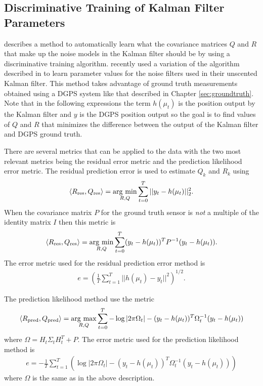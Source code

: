 \subsection{Discriminative Training of Kalman Filter Parameters}
\label{sec:kftrainingparams}
\cite{Abbeel-RSS-05} describes a method to automatically learn what the covariance matrices $Q$ and $R$ that make up the noise models in the Kalman filter should be by using a discriminative training algorithm. \cite{SakaiKuroda10} recently used a variation of the algorithm described in \cite{Abbeel-RSS-05} to learn parameter values for the noise filters used in their unscented Kalman filter. This method takes advantage of ground truth measurements obtained using a DGPS system like that described in Chapter \ref{sec:groundtruth}. Note that in the following expressions the term $h(\mu_t)$ is the position output by the Kalman filter and $y$ is the DGPS position output so the goal is to find values of $Q$ and $R$ that minimizes the difference between the output of the Kalman filter and DGPS ground truth.

There are several metrics that can be applied to the data with the two most relevant metrics being the residual error metric and the prediction likelihood error metric. The residual prediction error is used to estimate $Q_k$ and $R_k$ using
\begin{align*}
\left<R_{\text{res}},Q_{\text{res}}\right> = \mathop{\arg\,\min}\limits_{R,Q}\sum_{t=0}^T ||y_t-h(\mu_t)||_2^2.
\end{align*}
When the covariance matrix $P$ for the ground truth sensor is \textit{not} a multiple of the identity matrix $I$ then this metric is
\begin{align*}
\left<R_{\text{res}},Q_{\text{res}}\right> = \mathop{\arg\,\min}\limits_{R,Q}\sum_{t=0}^T (y_t-h(\mu_t))^TP^{-1}(y_t-h(\mu_t)).
\end{align*}
The error metric used for the residual prediction error method is
\begin{align}
\label{eq:kftrainingres}
e = \left(\frac{1}{T}\sum_{t=1}^T ||h(\mu_t)-y_t||^2\right)^{1/2}.
\end{align}

The prediction likelihood method use the metric
\begin{align*}
\left<R_{\text{pred}},Q_{\text{pred}}\right> = \mathop{\arg\,\max}\limits_{R,Q}\sum_{t=0}^T -\log|2\pi\Omega_t| - (y_t-h(\mu_t))^T\Omega_t^{-1}(y_t-h(\mu_t))
\end{align*}
where $\Omega = H_t\Sigma_tH_t^T+P$. The error metric used for the prediction likelihood method is
\begin{align}
\label{eq:kftrainingpred}
e = -\frac{1}{T}\sum_{t=1}^T \left(\log|2\pi\Omega_t| - (y_t-h(\mu_t))^T\Omega_t^{-1}(y_t-h(\mu_t))\right)
\end{align}
where $\Omega$ is the same as in the above description.

